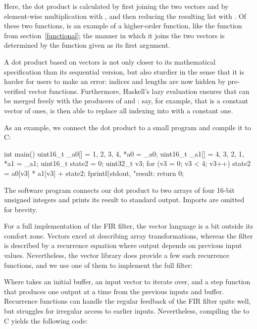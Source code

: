 \documentclass[../paper.tex]{subfiles}
\begin{document}
\noindent Here, the dot product is calculated by first joining the two vectors  and  by element-wise multiplication with , and then reducing the resulting list with . Of these two functions,  is an example of a higher-order function, like the  function from section~\ref{functional}; the manner in which it joins the two vectors is determined by the function given as its first argument.

A dot product based on vectors is not only closer to its mathematical specification than its sequential version, but also sturdier in the sense that it is harder for users to make an error: indices and lengths are now hidden by pre-verified vector functions. Furthermore, Haskell's lazy evaluation ensures that  can be merged freely with the producers of  and : say, for example, that  is a constant vector of ones,  is then able to replace all indexing into  with a constant one.

As an example, we connect the dot product to a small program and compile it to C:

\begin{code}
int main() {
  uint16_t _a0[] = {1, 2, 3, 4}, *a0 = _a0;
  uint16_t _a1[] = {4, 3, 2, 1}, *a1 = _a1;
  uint16_t state2 = 0;
  uint32_t v3;
  for (v3 = 0; v3 < 4; v3++)
    state2 = a0[v3] * a1[v3] + state2;
  fprintf(stdout, "result: %
  return 0;
}
\end{code}

\noindent The software program connects our dot product to two arrays of four 16-bit unsigned integers and prints its result to standard output. Imports are omitted for brevity.

For a full implementation of the FIR filter, the vector language is a bit outside its comfort zone. Vectors excel at describing array transformations, whereas the filter is described by a recurrence equation where output depends on previous input values. Nevertheless, the vector library does provide a few such recurrence functions, and we use one of them to implement the full filter:


\noindent Where  takes an initial buffer, an input vector to iterate over, and a step function that produces one output at a time from the previous inputs and buffer. Recurrence functions can handle the regular feedback of the FIR filter quite well, but struggles for irregular access to earlier inputs. Nevertheless, compiling the  to C yields the following code:
\end{document}
